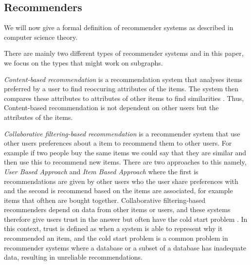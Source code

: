 \subsection{Recommenders}
\label{recommenders}
We will now give a formal definition of recommender systems as described in computer science theory.

There are mainly two different  types of recommender systems and in this paper, we focus on the types that might work on subgraphs.

\textit{Content-based recommendation} is a recommendation system that analyses items preferred by a user to find reoccuring attributes of the items. The system then compares these attributes to attributes of other items to find similarities \cite{lu2015recommender}. Thus, Content-based recommendation is not dependent on other users but the attributes of the items.

\textit{Collaborative filtering-based recommendation} is a recommender system that use other users preferences about a item to recommend them to other users. For example if two people buy the same items we could say that they are similar and then use this to recommend new items. There are two approaches to this namely, \textit{User Based Approach} and \textit{Item Based Approach} where the first is recommendations are given by other users who the user share preferences with and the second is recommend based on the items are associated, for example items that ofthen are bought together.
Collaborative filtering-based recommenders depend on data from other items or users, and these systems therefore give users trust in the answer but often have the cold start problem \cite{lu2015recommender}. In this context, trust is defined as when a system is able to represent why it recommended an item, and the cold start problem is a common problem in recommender systems where a database or a subset of a database has inadequate data, resulting in unreliable recommendations\cite{Ricci2015}.
